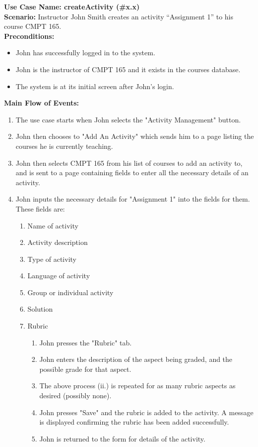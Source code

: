 \documentclass{article}
\begin{document}
\textbf{Use Case Name: createActivity (\#x.x)} \\
\textbf{Scenario:} Instructor John Smith creates an activity “Assignment 1” to his
course CMPT 165.\\
\textbf{Preconditions:}
\begin{itemize}
	\item John has successfully logged in to the system.
	\item John is the instructor of CMPT 165 and it exists in the courses database.
	\item The system is at its initial screen after John's login.
\end{itemize}
\textbf{Main Flow of Events:}
\begin{enumerate}
	\item The use case starts when John selects the "Activity Management" button.
	\item John then chooses to "Add An Activity" which sends him to a page listing
		the courses he is currently teaching.
	\item John then selects CMPT 165 from his list of courses to add an activity to, and is sent to 	
		a page containing fields to enter all the necessary details of an activity.
	\item  John inputs the necessary details for "Assignment 1" into the fields for them. These
		fields are:
	\begin{enumerate}
		\item Name of activity
		\item Activity description
		\item Type of activity
		\item Language of activity
		\item Group or individual activity
		\item Solution
		\item Rubric
		\begin{enumerate}
			\item 	John presses the "Rubric" tab.
			\item John enters the description of the aspect being graded, and the 
					possible grade for that aspect.
			\item The above process (ii.) is repeated for as many rubric aspects as desired
					(possibly none).
			\item John presses "Save" and the rubric is added to the activity.
					A message is displayed confirming the rubric has been added successfully.
			\item John is returned to the form for details of the activity.

\end{enumerate}
\end{enumerate}
\end{enumerate}
\end{document}
